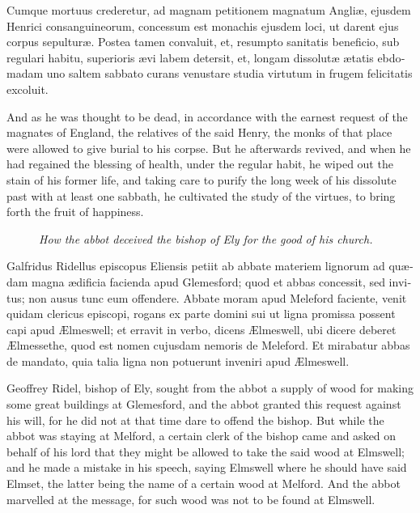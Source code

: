 \documentclass[10pt]{book}
\newcommand{\blockhead}[4][]{
\begin{figure}
\centering
\vspace{#4}
\parbox{2.75cm}{\begin{center}\footnotesize \color{BrickRed} \emph{#2}\\ #1 \end{center}}
\end{figure}
}
\begin{document}
\begin{paracol}{2}
\switchcolumn*

\begin{otherlanguage}{latin}
Cumque mortuus crederetur, ad magnam petitionem magnatum Angli\ae{}, ejusdem Henrici consanguineorum, concessum est monachis ejusdem loci, ut darent ejus corpus sepultur\ae{}. Postea tamen convaluit, et, resumpto sanitatis beneficio, sub regulari habitu, superioris \ae{}vi labem detersit, et, longam dissolut\ae{} \ae{}tatis ebdomadam uno saltem sabbato curans venustare studia virtutum in frugem felicitatis excoluit.
\end{otherlanguage}

\switchcolumn

And as he was thought to be dead, in accordance with the earnest request of the magnates of England, the relatives of the said Henry, the monks of that place were allowed to give burial to his corpse. But he afterwards revived, and when he had regained the blessing of health, under the regular habit, he wiped out the stain of his former life, and taking care to purify the long week of his dissolute past with at least one sabbath, he cultivated the study of the virtues, to bring forth the fruit of happiness.


\switchcolumn*

\clearpage

\begin{otherlanguage}{latin}
\blockhead{How the abbot deceived the bishop of Ely for the good of his church.}{4}{-.1cm}
Galfridus Ridellus episcopus Eliensis petiit ab abbate materiem lignorum ad qu\ae{}dam magna \ae{}dificia  facienda apud Glemesford; quod et abbas concessit, sed invitus; non ausus tunc eum offendere. Abbate moram apud Meleford faciente, venit quidam clericus episcopi, rogans ex parte domini sui ut ligna promissa possent capi apud \AE{}lmeswell; et erravit in verbo, dicens \AE{}lmeswell, ubi dicere deberet \AE{}lmessethe, quod est nomen cujusdam nemoris de Meleford. Et mirabatur abbas de mandato, quia talia ligna non potuerunt inveniri apud \AE{}lmeswell. 


\end{otherlanguage}

\switchcolumn

Geoffrey Ridel, bishop of Ely, sought from the abbot a supply of wood for making some great buildings at Glemesford, and the abbot granted this request against his will, for he did not at that time dare to offend the bishop. But while the abbot was staying at Melford, a certain clerk of the bishop came and asked on behalf of his lord that they might be allowed to take the said wood at Elmswell; and he made a mistake in his speech, saying Elmswell where he should have said Elmset, the latter being the name of a certain wood at Melford. And the abbot marvelled at the message, for such wood was not to be found at Elmswell.


\end{paracol}
\end{document}
